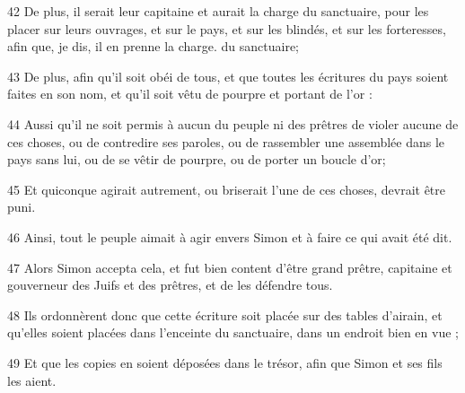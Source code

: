 \par 42 De plus, il serait leur capitaine et aurait la charge du sanctuaire, pour les placer sur leurs ouvrages, et sur le pays, et sur les blindés, et sur les forteresses, afin que, je dis, il en prenne la charge. du sanctuaire;
\par 43 De plus, afin qu'il soit obéi de tous, et que toutes les écritures du pays soient faites en son nom, et qu'il soit vêtu de pourpre et portant de l'or :
\par 44 Aussi qu'il ne soit permis à aucun du peuple ni des prêtres de violer aucune de ces choses, ou de contredire ses paroles, ou de rassembler une assemblée dans le pays sans lui, ou de se vêtir de pourpre, ou de porter un boucle d'or;
\par 45 Et quiconque agirait autrement, ou briserait l'une de ces choses, devrait être puni.
\par 46 Ainsi, tout le peuple aimait à agir envers Simon et à faire ce qui avait été dit.
\par 47 Alors Simon accepta cela, et fut bien content d'être grand prêtre, capitaine et gouverneur des Juifs et des prêtres, et de les défendre tous.
\par 48 Ils ordonnèrent donc que cette écriture soit placée sur des tables d'airain, et qu'elles soient placées dans l'enceinte du sanctuaire, dans un endroit bien en vue ;
\par 49 Et que les copies en soient déposées dans le trésor, afin que Simon et ses fils les aient.


